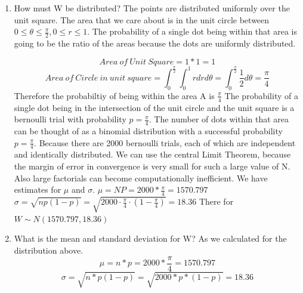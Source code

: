 \documentclass[svgnames]{article}
\begin{document}
\begin{enumerate}[label = (\alph*)]
\item
How must W be distributed?
\newline
\newline
The points are distributed uniformly over the unit square. The area that we care about is in the unit circle between $0 \leq \theta \leq \frac{\pi}{2}, 0 \leq r \leq 1$. The probability of a single dot being within that area is going to be the ratio of the areas because the dots are uniformly distributed. 

$$Area\ of\ Unit\ Square =1 * 1 = 1$$
$$Area\ of\ Circle \ in\ unit\ square =\int_{0}^{\frac{\pi}{2}}\int_{0}^{1}r drd\theta =\int_{0}^{\frac{\pi}{2}}\frac{1}{2}d\theta= \frac{\pi}{4} $$
Therefore the probabiltiy of being within the area A is $\frac{\pi}{4}$
\newline
\newline
The probability of a single dot being in the intersection of the unit circle and the unit square is a bernoulli trial with probability $p = \frac{\pi}{4}$. The number of dots within that area can be thought of as a binomial distribution with a successful probability $p = \frac{\pi}{4}$. Because there are 2000 bernoulli trials, each of which are independent and identically distributed. We can use the central Limit Theorem, because the margin of error in convergence is very small for such a large value of N. Also large factorials can become computationally inefficient. 
\newline
\newline
We have estimates for $\mu$ and $\sigma$.
\newline
$\mu=NP=2000*\frac{\pi}{4}=1570.797$
\newline
$\sigma = \sqrt{np(1-p)} = \sqrt{2000\cdot \frac{\pi}{4} \cdot (1-\frac{\pi}{4})}=18.36$
\newline
There for $W\sim N(1570.797, 18.36)$

\item 
What is the mean and standard deviation for W?
\newline
\newline
As we calculated for the distribution above.
\newline
$$ \mu = n*p = 2000 * \frac{\pi}{4}=1570.797$$
\newline
$$ \sigma = \sqrt{n*p(1-p)} = \sqrt{2000 * p * (1-p)}=18.36$$

\end{enumerate}
\end{document}
